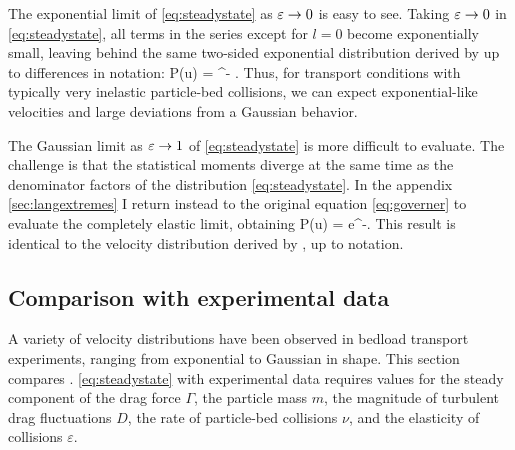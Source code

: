 The exponential limit of \DIFaddbegin {}\DIFaddend \ref{eq:steadystate} as $\varepsilon \rightarrow 0$ is easy to see. Taking $\varepsilon \rightarrow 0 $ in \DIFaddbegin {}\DIFaddend \ref{eq:steadystate}, all terms in the series except for \DIFdelbegin {}\DIFdelend \DIFaddbegin {}\DIFaddend $l=0$ become exponentially small, leaving behind the same two-sided exponential distribution derived by \cite{Fan2014} up to differences in notation:
\be P(u) = \DIFdelbegin {}\DIFdelend \DIFaddbegin {}\DIFaddend ^{\DIFdelbegin {}\DIFdelend \DIFaddbegin {}\DIFaddend - \DIFdelbegin {}\DIFdelend \DIFaddbegin {}\DIFaddend }. \ee
Thus, for \DIFdelbegin {}\DIFdelend \DIFaddbegin {}\DIFaddend transport conditions with typically very inelastic particle-bed collisions, we can expect exponential-like velocities and large deviations from a Gaussian behavior.

The Gaussian limit as $\varepsilon \rightarrow 1$ of \DIFaddbegin {}\DIFaddend \ref{eq:steadystate} is more difficult to evaluate. The challenge is that the statistical moments \DIFdelbegin {}\DIFdelend \DIFaddbegin {}\DIFaddend diverge at the same time as the denominator factors of the distribution \DIFaddbegin {}\DIFaddend \ref{eq:steadystate}. In the appendix \DIFdelbegin {}\DIFdelend \DIFaddbegin {}\DIFaddend \ref{sec:langextremes} I return instead to the original equation \ref{eq:governer} to evaluate the completely elastic limit, obtaining
\be P(u) = e^{-}. \label{eq:gaussian}\ee
This result is identical to the velocity distribution derived by \citet{Ancey2014}, up to notation.

\subsection{Comparison with experimental data}
\label{sec:langexperimentcomparison}

A variety of velocity distributions have been observed in bedload transport experiments, ranging from exponential to Gaussian in shape. 
This section compares \DIFdelbegin {}\DIFdelend \DIFaddbegin {}\DIFaddend . \ref{eq:steadystate} with experimental data requires values for the steady component of the drag force $\Gamma$, the particle mass $m$, the magnitude of turbulent drag fluctuations $D$, the rate of particle-bed collisions $\nu$, and the \DIFdelbegin {}\DIFdelend \DIFaddbegin {}\DIFaddend elasticity of collisions $\varepsilon$.

